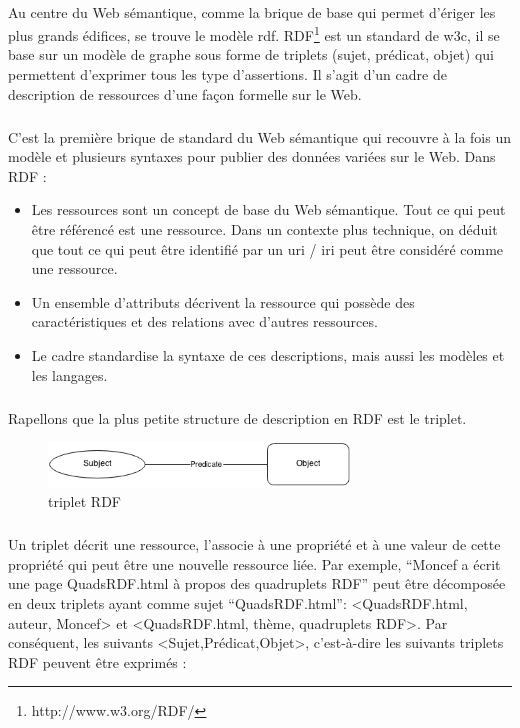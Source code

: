 \paragraph{}
Au centre du Web sémantique, comme la brique de base qui permet d’ériger les plus grands édifices, se trouve le modèle \gls{rdf}. RDF\footnote{http://www.w3.org/RDF/} est un standard de \gls{w3c}, il se base sur un modèle de graphe sous forme de triplets (sujet, prédicat, objet) qui permettent d'exprimer tous les type d'assertions. Il s’agit d’un cadre de description de ressources d’une façon formelle sur le Web.
\subparagraph{}
C’est la première brique de standard du Web sémantique qui recouvre à la fois un modèle et plusieurs syntaxes pour publier des données variées sur le Web.
\newline
Dans RDF :
\newline
\begin{itemize}
\item Les ressources sont un concept de base du Web sémantique. Tout ce qui peut être référencé est une ressource. Dans un contexte plus technique, on déduit que tout ce qui peut être identifié par un \gls{uri} / \gls{iri} peut être considéré comme une ressource.
\item Un ensemble d’attributs décrivent la ressource qui possède des caractéristiques et des relations avec d’autres ressources.
\item Le cadre standardise la syntaxe de ces descriptions, mais aussi les modèles et les langages.
\end{itemize}
\subparagraph{}
Rapellons que la plus petite structure de description en RDF est le triplet.
\begin{figure}[H]
\centering
\includegraphics[width=8cm]{tripletrdf.png}
\caption{triplet RDF}
\end{figure}
\subparagraph{}
Un triplet décrit une ressource, l’associe à une propriété et à une valeur de cette propriété qui peut être une nouvelle ressource liée. 
\newline
Par exemple, ``Moncef a écrit une page QuadsRDF.html à propos des quadruplets RDF” peut être décomposée en deux triplets ayant comme sujet ``QuadsRDF.html”: <QuadsRDF.html, auteur, Moncef> et <QuadsRDF.html, thème, quadruplets RDF>.
\newline
Par conséquent, les suivants <Sujet,Prédicat,Objet>, c'est-à-dire les suivants triplets RDF peuvent être exprimés :
